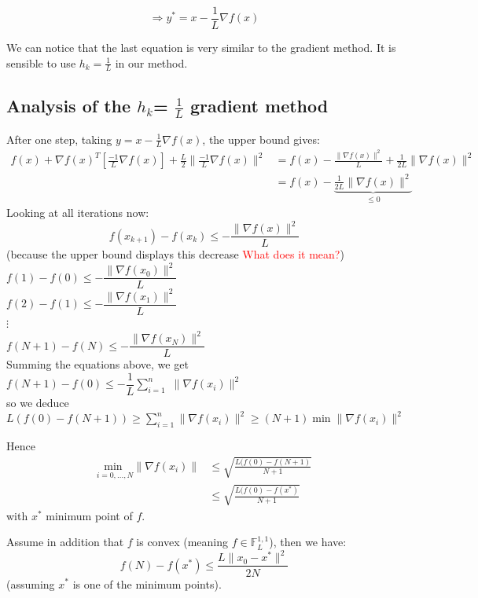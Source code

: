 $$ \Rightarrow y^{*} = x- \frac{1}{L} \nabla f(x)$$

We can notice that the last equation is very similar to the gradient method. It is sensible to use $h_k=\frac{1}{L}$ in our method. 

\subsection{Analysis of the $h_{k}$= $\frac{1}{L}$ gradient method}
 
After one step, taking  $y= x-\frac{1}{L}\nabla f(x)$, the upper bound gives:
\begin{align*}
f(x) + \nabla f(x)^{T} [\frac{-1}{L} \nabla f(x)]+\frac{L}{2} \|  \frac{-1}{L}\nabla f(x)\|^2
& =f(x)- \frac{\|\nabla f(x)\|^{2}}{L}+\frac{1}{2L} \|\nabla f(x)\|^{2} \\
& =f(x)-\underbrace{\frac{1}{2L} \|\nabla f(x)\|^{2}}_{\leq 0}
\end{align*}
Looking at all iterations now:
$$ f(x_{k+1})-f(x_{k}) \leq - \frac{\|\nabla f(x)\|^{2}}{L}$$
(because the upper bound displays this decrease \textcolor{red}{What does it mean?})\\


$f(1)-f(0) \leq -\dfrac{\|\nabla f(x_{0})\|^{2}}{L}$\\
$f(2)-f(1) \leq -\dfrac{\|\nabla f(x_{1})\|^{2}}{L}$ \\
$\vdots$ \\
$f(N+1)-f(N) \leq -\dfrac{\|\nabla f(x_{N})\|^{2}}{L}$\\

Summing the equations above, we get \\
$f(N+1)-f(0) \leq - \dfrac{1}{L} \sum\limits_{i=1}^{n}$ $\|\nabla f(x_{i})\|^{2}$\\
so we deduce \\
$L(f(0)-f(N+1)) \geq \sum\limits_{i=1}^{n} \|\nabla f(x_{i})\|^{2} \geq (N+1) \min \|\nabla f(x_{i})\|^{2}$

Hence
\begin{align*}
\underset{i=0,...,N}{\text{min }} \|\nabla f(x_{i})\| & \leq \sqrt{\frac{L(f(0)-f(N+1)}{N+1}} \\
& \leq \sqrt{\frac{L(f(0)-f(x^*)}{N+1}}
\end{align*}
with $x^*$ minimum point of $f$.

\begin{lemma}
Assume in addition that $f$ is convex (meaning $f \in \mathbb{F}^{1,1}_{L}$)\footnotemark, then we have: 
$$ f(N)-f(x^*) \leq \frac{L\|x_{0}-x^*\|^{2}}{2N} $$ 
 (assuming $x^*$ is one of the minimum points).
\end{lemma}
 
